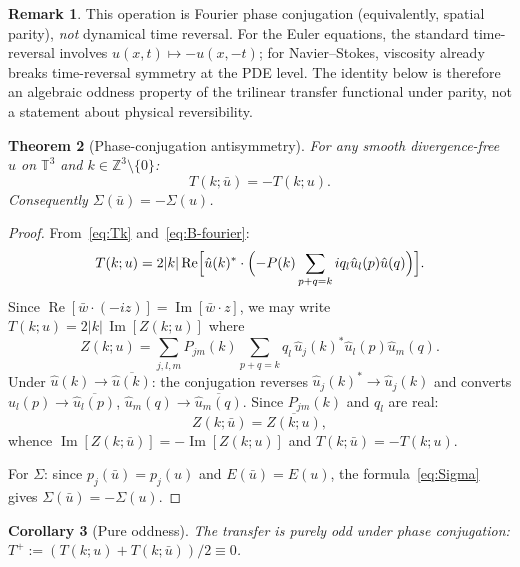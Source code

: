 \documentclass[11pt]{article}
\newtheorem{theorem}{Theorem}[section]
\newtheorem{corollary}[theorem]{Corollary}
\theoremstyle{definition}
\newtheorem{remark}[theorem]{Remark}
\newcommand{\T}{\mathbb{T}}
\newcommand{\Z}{\mathbb{Z}}
\DeclareMathOperator{\re}{Re}
\DeclareMathOperator{\im}{Im}
\begin{document}
\begin{remark}
This operation is Fourier phase conjugation (equivalently,
spatial parity), \emph{not} dynamical time reversal.
For the Euler equations, the standard time-reversal
involves $u(x,t)\mapsto -u(x,-t)$; for Navier--Stokes,
viscosity already breaks time-reversal symmetry at the
PDE level.  The identity below is therefore an algebraic
oddness property of the trilinear transfer functional
under parity, not a statement about physical reversibility.
\end{remark}

\begin{theorem}[Phase-conjugation antisymmetry]
\label{thm:antisym}
For any smooth divergence-free $u$ on $\T^3$ and
$k\in\Z^3\setminus\{0\}$:
\begin{equation}
T(k;\bar u) = -T(k;u).
\end{equation}
Consequently $\Sigma(\bar u) = -\Sigma(u)$.
\end{theorem}

\begin{proof}
From~\eqref{eq:Tk} and~\eqref{eq:B-fourier}:
\begin{equation}
T(k;u) = 2|k|\re\Bigl[\hat u(k)^*\cdot
\Bigl(-P(k)\sum_{p+q=k}iq_l\hat u_l(p)\hat u(q)
\Bigr)\Bigr].
\end{equation}
Since $\re[\bar w\cdot(-iz)] = \im[\bar w\cdot z]$,
we may write $T(k;u) = 2|k|\,\im[Z(k;u)]$ where
\begin{equation}\label{eq:Z}
Z(k;u) = \sum_{j,l,m}P_{jm}(k)\sum_{p+q=k}
q_l\,\hat u_j(k)^*\hat u_l(p)\hat u_m(q).
\end{equation}
Under $\hat u(k)\to\overline{\hat u(k)}$: the conjugation
reverses $\hat u_j(k)^*\to\hat u_j(k)$ and converts
$\hat u_l(p)\to\overline{\hat u_l(p)}$,
$\hat u_m(q)\to\overline{\hat u_m(q)}$.  Since $P_{jm}(k)$
and $q_l$ are real:
\begin{equation}
Z(k;\bar u) = \overline{Z(k;u)},
\end{equation}
whence $\im[Z(k;\bar u)]=-\im[Z(k;u)]$ and
$T(k;\bar u)=-T(k;u)$.

For $\Sigma$: since $p_j(\bar u) = p_j(u)$ and
$E(\bar u) = E(u)$, the formula~\eqref{eq:Sigma}
gives $\Sigma(\bar u) = -\Sigma(u)$.
\end{proof}

\begin{corollary}[Pure oddness]
\label{cor:odd}
The transfer is purely odd under phase conjugation:
$T^+ := (T(k;u)+T(k;\bar u))/2 \equiv 0$.
\end{corollary}
\end{document}

